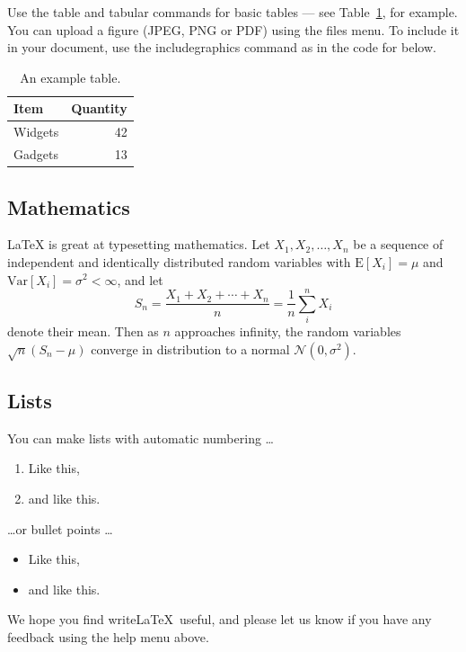     Use the table and tabular commands for basic tables --- see Table~\ref{tab:widgets}, for example. You can upload a figure (JPEG, PNG or PDF) using the files menu. To include it in your document, use the includegraphics command as in the code for below.


    \begin{table}
        \centering
        \begin{tabular}{l|r}
            Item & Quantity \\\hline
            Widgets & 42 \\
            Gadgets & 13
        \end{tabular}
        \caption{\label{tab:widgets}An example table.}
    \end{table}

    \subsection{Mathematics}

    \LaTeX{} is great at typesetting mathematics. Let $X_1, X_2, \ldots, X_n$ be a sequence of independent and identically distributed random variables with $\text{E}[X_i] = \mu$ and $\text{Var}[X_i] = \sigma^2 < \infty$, and let
    $$S_n = \frac{X_1 + X_2 + \cdots + X_n}{n}
    = \frac{1}{n}\sum_{i}^{n} X_i$$
    denote their mean. Then as $n$ approaches infinity, the random variables $\sqrt{n}(S_n - \mu)$ converge in distribution to a normal $\mathcal{N}(0, \sigma^2)$.

    \subsection{Lists}

    You can make lists with automatic numbering \dots

    \begin{enumerate}
        \item Like this,
        \item and like this.
    \end{enumerate}
    \dots or bullet points \dots
    \begin{itemize}
        \item Like this,
        \item and like this.
    \end{itemize}

    We hope you find write\LaTeX\ useful, and please let us know if you have any feedback using the help menu above.


